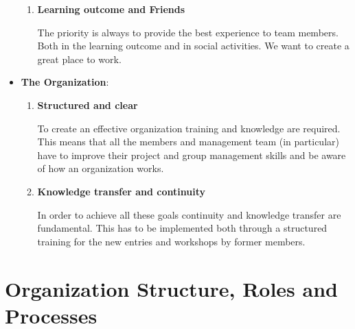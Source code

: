 \documentclass[graybox]{svmult}
\begin{document}
\begin{itemize}
\begin{enumerate}
        \item \textbf{Learning outcome and Friends}
        
        The priority is always to provide the best experience to team members. Both in the learning outcome and in social activities. We want to create a great place to work.
    \end{enumerate}
    \item \textbf{The Organization}:
    \begin{enumerate}
        \item \textbf{Structured and clear}
        
        To create an effective organization training and knowledge are required. This means that all the members and management team (in particular) have to improve their project and group management skills and be aware of how an organization works.
    
        \item \textbf{Knowledge transfer and continuity}
    
        In order to achieve all these goals continuity and knowledge transfer are fundamental. This has to be implemented both through a structured training for the new entries and workshops by former members.
    \end{enumerate}
\end{itemize}

\section{Organization Structure, Roles and Processes}
\label{sec:2}
\end{document}
